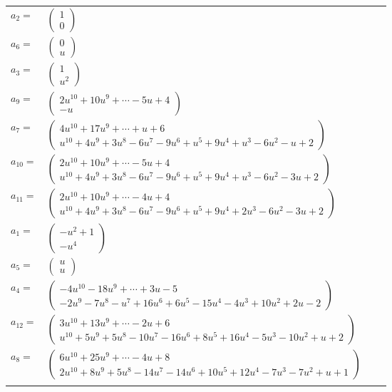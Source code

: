 \documentclass[1p]{elsarticle_modified}
\theoremstyle{definition}
\begin{document}
\begin{tabular}{m{7pt} m{180pt} m{7pt} m{180pt} }
\flushright $a_{2}=$&$\begin{pmatrix}1\\0\end{pmatrix}$ \\
\flushright $a_{6}=$&$\begin{pmatrix}0\\u\end{pmatrix}$ \\
\flushright $a_{3}=$&$\begin{pmatrix}1\\u^2\end{pmatrix}$ \\
\flushright $a_{9}=$&$\begin{pmatrix}2 u^{10}+10 u^9+\cdots-5 u+4\\- u\end{pmatrix}$ \\
\flushright $a_{7}=$&$\begin{pmatrix}4 u^{10}+17 u^9+\cdots+u+6\\u^{10}+4 u^9+3 u^8-6 u^7-9 u^6+u^5+9 u^4+u^3-6 u^2- u+2\end{pmatrix}$ \\
\flushright $a_{10}=$&$\begin{pmatrix}2 u^{10}+10 u^9+\cdots-5 u+4\\u^{10}+4 u^9+3 u^8-6 u^7-9 u^6+u^5+9 u^4+u^3-6 u^2-3 u+2\end{pmatrix}$ \\
\flushright $a_{11}=$&$\begin{pmatrix}2 u^{10}+10 u^9+\cdots-4 u+4\\u^{10}+4 u^9+3 u^8-6 u^7-9 u^6+u^5+9 u^4+2 u^3-6 u^2-3 u+2\end{pmatrix}$ \\
\flushright $a_{1}=$&$\begin{pmatrix}- u^2+1\\- u^4\end{pmatrix}$ \\
\flushright $a_{5}=$&$\begin{pmatrix}u\\u\end{pmatrix}$ \\
\flushright $a_{4}=$&$\begin{pmatrix}-4 u^{10}-18 u^9+\cdots+3 u-5\\-2 u^9-7 u^8- u^7+16 u^6+6 u^5-15 u^4-4 u^3+10 u^2+2 u-2\end{pmatrix}$ \\
\flushright $a_{12}=$&$\begin{pmatrix}3 u^{10}+13 u^9+\cdots-2 u+6\\u^{10}+5 u^9+5 u^8-10 u^7-16 u^6+8 u^5+16 u^4-5 u^3-10 u^2+u+2\end{pmatrix}$ \\
\flushright $a_{8}=$&$\begin{pmatrix}6 u^{10}+25 u^9+\cdots-4 u+8\\2 u^{10}+8 u^9+5 u^8-14 u^7-14 u^6+10 u^5+12 u^4-7 u^3-7 u^2+u+1\end{pmatrix}$\\&\end{tabular}
\end{document}
